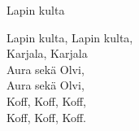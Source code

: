 \begin{song}{Lapin kulta}
	
	
	Lapin kulta, Lapin kulta,\\
	Karjala, Karjala\\
	Aura sekä Olvi,\\
	Aura sekä Olvi,\\
	Koff, Koff, Koff,\\
	Koff, Koff, Koff.
	
\end{song}
